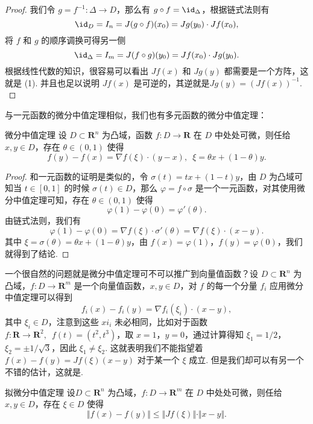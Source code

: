 \begin{proof}
    我们令 $g = f^{-1}\colon \Delta\to D$，那么有 $g \circ f = \id_{\Delta}$，根据链式法则有 \[\id_{D} = I_{n} = J(g\circ f)(x_0) = Jg(y_0)\cdot Jf(x_0),\]
    将 $f$ 和 $g$ 的顺序调换可得另一侧 \[\id_{\Delta} = I_m = J(f\circ g)(y_0) = Jf(x_0)\cdot Jg(y_0).\]
    根据线性代数的知识，很容易可以看出 $Jf(x)$ 和 $Jg(y)$ 都需要是一个方阵，这就是 (1). 并且也足以说明 $Jf(x)$ 是可逆的，其逆就是$Jg(y) = (Jf(x))^{-1}.$
\end{proof}

与一元函数的微分中值定理相似，我们也有多元函数的微分中值定理：

\begin{theorem}{微分中值定理}{}
    设 $D\subset \mathbf{R}^n$ 为凸域，函数 $f\colon D\to \mathbf{R}$ 在 $D$ 中处处可微，则任给 $x,y\in D$，存在 $\theta\in (0, 1)$ 使得\[f(y) - f(x) = \nabla f(\xi)\cdot(y-x),\enspace \xi=\theta x + (1-\theta)y.\]
\end{theorem}

\begin{proof}
    和一元函数的证明是类似的，令 $\sigma(t) = tx + (1 - t)y$，由 $D$ 为凸域可知当 $t\in [0, 1]$ 的时候 $\sigma(t)\in D$，那么 $\varphi = f\circ \sigma$ 是一个一元函数，对其使用微分中值定理可知，存在 $\theta\in (0, 1)$ 使得 \[\varphi(1) - \varphi(0) = \varphi'(\theta).\]
    由链式法则，我们有 \[\varphi(1) - \varphi(0) = \nabla f(\xi)\cdot\sigma'(\theta) = \nabla f(\xi)\cdot(x - y).\]
    其中 $\xi = \sigma(\theta) = \theta x + (1 - \theta)y$，由 $f(x) = \varphi(1)$，$f(y) = \varphi(0)$，我们就得到了结论.
\end{proof}

一个很自然的问题就是微分中值定理可不可以推广到向量值函数？设 $D\subset \mathbf{R}^n$ 为凸域，$f\colon D\to \mathbf{R}^m$ 是一个向量值函数，$x, y\in D$，对 $f$ 的每一个分量 $f_i$ 应用微分中值定理可以得到\[f_i(x) - f_i(y) = \nabla f_i(\xi_i)\cdot(x-y),\]其中 $\xi_i\in D$，注意到这些 $xi_i$ 未必相同，比如对于函数 $f\colon \mathbf{R}\to\mathbf{R}^2,\enspace f(t) = (t^2, t^3)$，取 $x = 1$，$y = 0$，通过计算得知 $\xi_1 = 1/2$，$\xi_2 = \pm1/\sqrt{3}$，因此 $\xi_1 \neq \xi_2$. 这就表明我们不能指望着 $f(x) - f(y) = Jf(\xi)(x-y)$ 对于某一个 $\xi$ 成立. 但是我们却可以有另一个不错的估计，这就是.

\begin{theorem}{拟微分中值定理}{}
    设$D\subset \mathbf{R}^n$ 为凸域，$f\colon D\to \mathbf{R}^m$ 在 $D$ 中处处可微，则任给 $x, y\in D$，存在 $\xi\in D$ 使得\[\Vert f(x) - f(y)\Vert \leqslant \Vert Jf(\xi)\Vert\cdot \Vert x - y\Vert.\]
\end{theorem}

